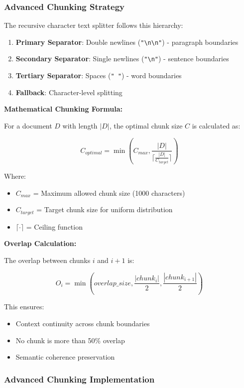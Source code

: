 \documentclass[12pt,a4paper]{article}
\begin{document}
\subsubsection{Advanced Chunking Strategy}

The recursive character text splitter follows this hierarchy:

\begin{enumerate}
    \item \textbf{Primary Separator}: Double newlines (\texttt{"\textbackslash n\textbackslash n"}) - paragraph boundaries
    \item \textbf{Secondary Separator}: Single newlines (\texttt{"\textbackslash n"}) - sentence boundaries
    \item \textbf{Tertiary Separator}: Spaces (\texttt{" "}) - word boundaries
    \item \textbf{Fallback}: Character-level splitting
\end{enumerate}

\textbf{Mathematical Chunking Formula:}

For a document $D$ with length $|D|$, the optimal chunk size $C$ is calculated as:

$$C_{optimal} = \min\left(C_{max}, \frac{|D|}{\lceil \frac{|D|}{C_{target}} \rceil}\right)$$

Where:
\begin{itemize}
    \item $C_{max}$ = Maximum allowed chunk size (1000 characters)
    \item $C_{target}$ = Target chunk size for uniform distribution
    \item $\lceil \cdot \rceil$ = Ceiling function
\end{itemize}

\textbf{Overlap Calculation:}

The overlap between chunks $i$ and $i+1$ is:

$$O_i = \min(overlap\_size, \frac{|chunk_i|}{2}, \frac{|chunk_{i+1}|}{2})$$

This ensures:
\begin{itemize}
    \item Context continuity across chunk boundaries
    \item No chunk is more than 50\% overlap
    \item Semantic coherence preservation
\end{itemize}

\subsubsection{Advanced Chunking Implementation}
\end{document}
